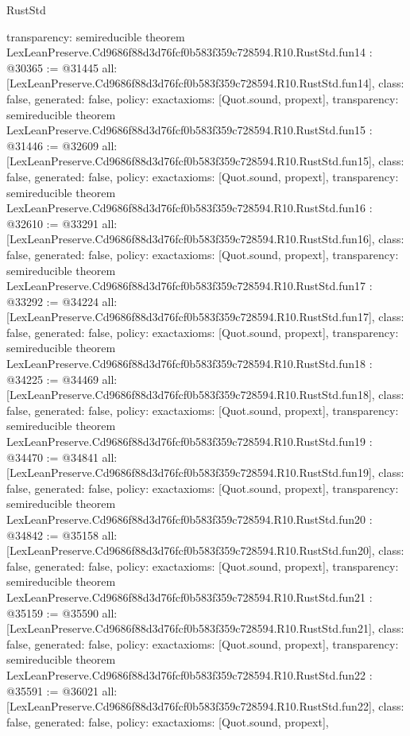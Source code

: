 \begin{lexlean}{RustStd}
\begin{coremodule}
{  transparency: semireducible
}
theorem LexLeanPreserve.Cd9686f88d3d76fcf0b583f359c728594.R10.RustStd.fun14 : @30365 := @31445 {
  all: [LexLeanPreserve.Cd9686f88d3d76fcf0b583f359c728594.R10.RustStd.fun14],
  class: false,
  generated: false,
  policy: exact{axioms: [Quot.sound, propext]},
  transparency: semireducible
}
theorem LexLeanPreserve.Cd9686f88d3d76fcf0b583f359c728594.R10.RustStd.fun15 : @31446 := @32609 {
  all: [LexLeanPreserve.Cd9686f88d3d76fcf0b583f359c728594.R10.RustStd.fun15],
  class: false,
  generated: false,
  policy: exact{axioms: [Quot.sound, propext]},
  transparency: semireducible
}
theorem LexLeanPreserve.Cd9686f88d3d76fcf0b583f359c728594.R10.RustStd.fun16 : @32610 := @33291 {
  all: [LexLeanPreserve.Cd9686f88d3d76fcf0b583f359c728594.R10.RustStd.fun16],
  class: false,
  generated: false,
  policy: exact{axioms: [Quot.sound, propext]},
  transparency: semireducible
}
theorem LexLeanPreserve.Cd9686f88d3d76fcf0b583f359c728594.R10.RustStd.fun17 : @33292 := @34224 {
  all: [LexLeanPreserve.Cd9686f88d3d76fcf0b583f359c728594.R10.RustStd.fun17],
  class: false,
  generated: false,
  policy: exact{axioms: [Quot.sound, propext]},
  transparency: semireducible
}
theorem LexLeanPreserve.Cd9686f88d3d76fcf0b583f359c728594.R10.RustStd.fun18 : @34225 := @34469 {
  all: [LexLeanPreserve.Cd9686f88d3d76fcf0b583f359c728594.R10.RustStd.fun18],
  class: false,
  generated: false,
  policy: exact{axioms: [Quot.sound, propext]},
  transparency: semireducible
}
theorem LexLeanPreserve.Cd9686f88d3d76fcf0b583f359c728594.R10.RustStd.fun19 : @34470 := @34841 {
  all: [LexLeanPreserve.Cd9686f88d3d76fcf0b583f359c728594.R10.RustStd.fun19],
  class: false,
  generated: false,
  policy: exact{axioms: [Quot.sound, propext]},
  transparency: semireducible
}
theorem LexLeanPreserve.Cd9686f88d3d76fcf0b583f359c728594.R10.RustStd.fun20 : @34842 := @35158 {
  all: [LexLeanPreserve.Cd9686f88d3d76fcf0b583f359c728594.R10.RustStd.fun20],
  class: false,
  generated: false,
  policy: exact{axioms: [Quot.sound, propext]},
  transparency: semireducible
}
theorem LexLeanPreserve.Cd9686f88d3d76fcf0b583f359c728594.R10.RustStd.fun21 : @35159 := @35590 {
  all: [LexLeanPreserve.Cd9686f88d3d76fcf0b583f359c728594.R10.RustStd.fun21],
  class: false,
  generated: false,
  policy: exact{axioms: [Quot.sound, propext]},
  transparency: semireducible
}
theorem LexLeanPreserve.Cd9686f88d3d76fcf0b583f359c728594.R10.RustStd.fun22 : @35591 := @36021 {
  all: [LexLeanPreserve.Cd9686f88d3d76fcf0b583f359c728594.R10.RustStd.fun22],
  class: false,
  generated: false,
  policy: exact{axioms: [Quot.sound, propext]},
}
\end{coremodule}
\end{lexlean}
